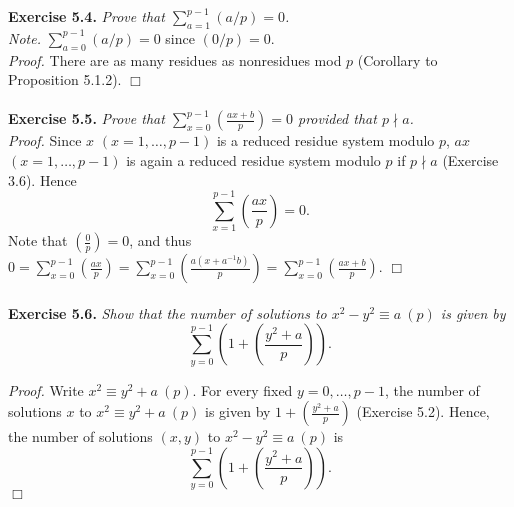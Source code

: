 \documentclass{article}
\begin{document}
\textbf{Exercise 5.4.}
\emph{Prove that $\sum_{a=1}^{p-1} (a/p) = 0$.} \\

\emph{Note.}
$\sum_{a=0}^{p-1} (a/p) = 0$ since $(0/p) = 0$. \\

\emph{Proof.}
There are as many residues as nonresidues mod $p$ (Corollary to Proposition 5.1.2).
$\Box$ \\\\






\textbf{Exercise 5.5.}
\emph{Prove that $\sum_{x=0}^{p-1} \left( \frac{ax+b}{p} \right) = 0$
provided that $p \nmid a$.} \\

\emph{Proof.}
Since $x$ $(x = 1, \ldots, p-1)$ is a reduced residue system modulo $p$,
$ax$ $(x = 1, \ldots, p-1)$ is again a reduced residue system modulo $p$ if $p \nmid a$
(Exercise 3.6).
Hence
$$\sum_{x=1}^{p-1} \left( \frac{ax}{p} \right) = 0.$$
Note that $\left( \frac{0}{p} \right) = 0$,
and thus
$0
= \sum_{x=0}^{p-1} \left( \frac{ax}{p} \right)
= \sum_{x=0}^{p-1} \left( \frac{a(x+a^{-1}b)}{p} \right)
= \sum_{x=0}^{p-1} \left( \frac{ax+b}{p} \right)$.
$\Box$ \\\\






\textbf{Exercise 5.6.}
\emph{Show that the number of solutions to $x^2 - y^2 \equiv a \: (p)$
is given by
$$\sum_{y=0}^{p-1} \left( 1 + \left( \frac{y^2 + a}{p} \right) \right).$$ }

\emph{Proof.}
Write $x^2 \equiv y^2 + a \: (p)$.
For every fixed $y = 0, \ldots, p-1$,
the number of solutions $x$ to $x^2 \equiv y^2 + a \: (p)$
is given by $1 + \left( \frac{y^2 + a}{p} \right)$ (Exercise 5.2).
Hence, the number of solutions $(x, y)$ to $x^2 - y^2 \equiv a \: (p)$
is
$$\sum_{y=0}^{p-1} \left( 1 + \left( \frac{y^2 + a}{p} \right) \right).$$
$\Box$ \\\\



\end{document}

